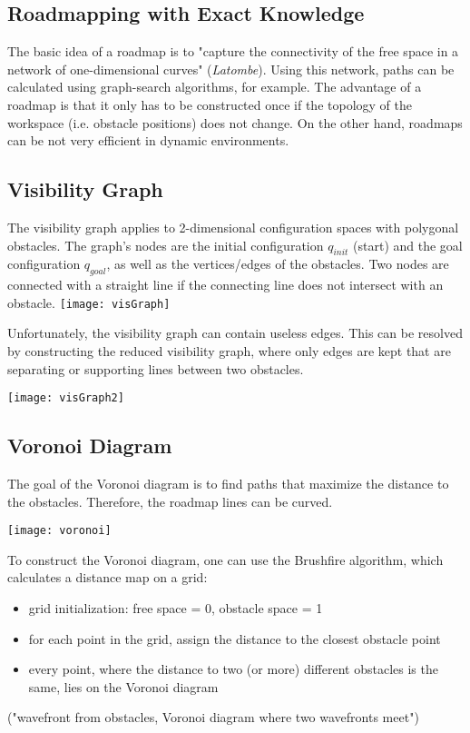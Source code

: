 \begin{multicols*}{2}
\section{Roadmapping with Exact Knowledge}
The basic idea of a roadmap is to "capture the connectivity of the free space in a network of one-dimensional curves" (\textit{Latombe}). Using this network, paths can be calculated using graph-search algorithms, for example. The advantage of a roadmap is that it only has to be constructed once if the topology of the workspace (i.e. obstacle positions) does not change. On the other hand, roadmaps can be not very efficient in dynamic environments.

\subsection{Visibility Graph}
The visibility graph applies to 2-dimensional configuration spaces with polygonal obstacles. The graph's nodes are the initial configuration $q_{init}$ (start) and the goal configuration $q_{goal}$, as well as the vertices/edges of the obstacles. Two nodes are connected with a straight line if the connecting line does not intersect with an obstacle.
\texttt{[image: visGraph]}

Unfortunately, the visibility graph can contain useless edges. This can be resolved by constructing the reduced visibility graph, where only edges are kept that are separating or supporting lines between two obstacles. 

\texttt{[image: visGraph2]}

\subsection{Voronoi Diagram}
The goal of the Voronoi diagram is to find paths that maximize the distance to the obstacles. Therefore, the roadmap lines can be curved.

\texttt{[image: voronoi]}

To construct the Voronoi diagram, one can use the Brushfire algorithm, which calculates a distance map on a grid:
\begin{itemize}
	\item grid initialization: free space = 0, obstacle space = 1
	\item for each point in the grid, assign the distance to the closest obstacle point
	\item every point, where the distance to two (or more) different obstacles is the same, lies on the Voronoi diagram
\end{itemize}
("wavefront from obstacles, Voronoi diagram where two wavefronts meet")


\end{multicols*}
